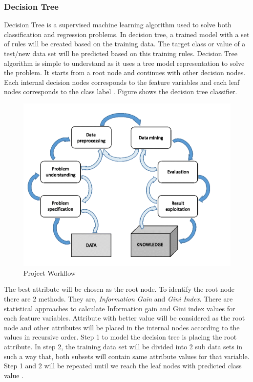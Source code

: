 \documentclass[sigconf]{acmart}
\begin{document}
\subsubsection{Decision Tree}

Decision Tree is a supervised machine learning algorithm used to solve both classification and regression problems. In decision tree, a trained model with a set of rules will be created based on the training data. The target class or value of a test/new data set will be predicted based on this training rules. Decision Tree algorithm is simple to understand as it uses a tree model representation to solve the problem. It starts from a root node and continues with other decision nodes. Each internal decision nodes corresponds to the feature variables and each leaf nodes corresponds to the class label \cite{decision-tree}. Figure shows the decision tree classifier. 


\begin{figure}[htb]
  \centering
  \includegraphics[width=1.0\columnwidth]{project/images/Figure1.png}
  \caption{Project Workflow
  \cite{preprocessing}}
  \label{fig:Figure1} 
\end{figure}

The best attribute will be chosen as the root node. To identify the root node there are 2 methods. They are, \emph{Information Gain} and \emph{Gini Index}. There are statistical approaches to calculate Information gain and Gini index values for each feature variables. Attribute with better value will be considered as the root node and other attributes will be placed in the internal nodes according to the values in recursive order. Step 1 to model the decision tree is placing the root attribute. In step 2, the training data set will be divided into 2 sub data sets in such a way that, both subsets will contain same attribute values for that variable. Step 1 and 2 will be repeated until we reach the leaf nodes with predicted class value \cite{decision-tree}.
\end{document}
